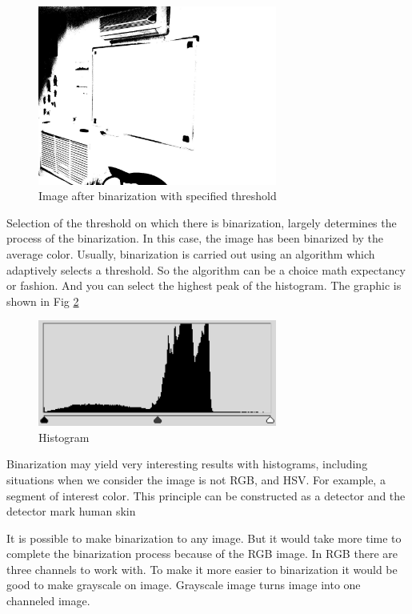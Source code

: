 \begin{figure}[h]
    \centering
    \includegraphics[width=0.7\textwidth]{Figures/image_after_threshold}
    \caption{Image after binarization with specified threshold}
    \label{fig:image_after_threshold}
\end{figure}

Selection of the threshold on which there is binarization, largely determines the process of the binarization. In this case, the image has been binarized by the average color. Usually, binarization is carried out using an algorithm which adaptively selects a threshold. So the algorithm can be a choice math expectancy or fashion. And you can select the highest peak of the histogram. The graphic is shown in Fig \ref{fig:histogram}

\begin{figure}[h]
    \centering
    \includegraphics[width=0.7\textwidth]{Figures/histogram}
    \caption{Histogram}
    \label{fig:histogram}
\end{figure}


Binarization may yield very interesting results with histograms, including situations when we consider the image is not RGB, and HSV. For example, a segment of interest color. This principle can be constructed as a detector and the detector mark human skin

It is possible to make binarization to any image. But it would take more time to complete the binarization process because of the RGB image. In RGB there are three channels to work with. To make it more easier to binarization it would be good to make grayscale on image. Grayscale image turns image into one channeled image.

